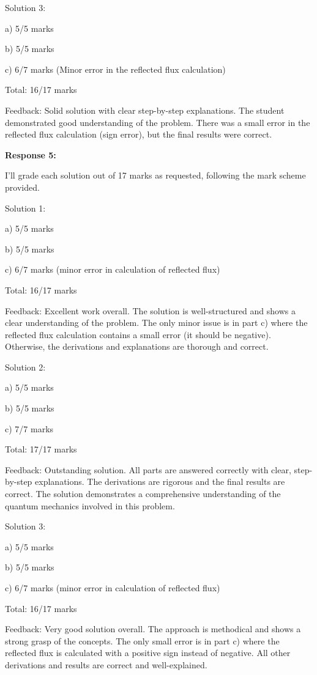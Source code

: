 \documentclass[a4paper,11pt]{article}
\begin{document}
Solution 3:

a) 5/5 marks

b) 5/5 marks

c) 6/7 marks (Minor error in the reflected flux calculation)

Total: 16/17 marks

Feedback: Solid solution with clear step-by-step explanations. The student demonstrated good understanding of the problem. There was a small error in the reflected flux calculation (sign error), but the final results were correct.

\bigskip
\textbf{Response 5:}

I'll grade each solution out of 17 marks as requested, following the mark scheme provided.

Solution 1:

a) 5/5 marks

b) 5/5 marks

c) 6/7 marks (minor error in calculation of reflected flux)

Total: 16/17 marks

Feedback: Excellent work overall. The solution is well-structured and shows a clear understanding of the problem. The only minor issue is in part c) where the reflected flux calculation contains a small error (it should be negative). Otherwise, the derivations and explanations are thorough and correct.

Solution 2:

a) 5/5 marks

b) 5/5 marks

c) 7/7 marks

Total: 17/17 marks

Feedback: Outstanding solution. All parts are answered correctly with clear, step-by-step explanations. The derivations are rigorous and the final results are correct. The solution demonstrates a comprehensive understanding of the quantum mechanics involved in this problem.

Solution 3:

a) 5/5 marks

b) 5/5 marks

c) 6/7 marks (minor error in calculation of reflected flux)

Total: 16/17 marks

Feedback: Very good solution overall. The approach is methodical and shows a strong grasp of the concepts. The only small error is in part c) where the reflected flux is calculated with a positive sign instead of negative. All other derivations and results are correct and well-explained.
\end{document}
